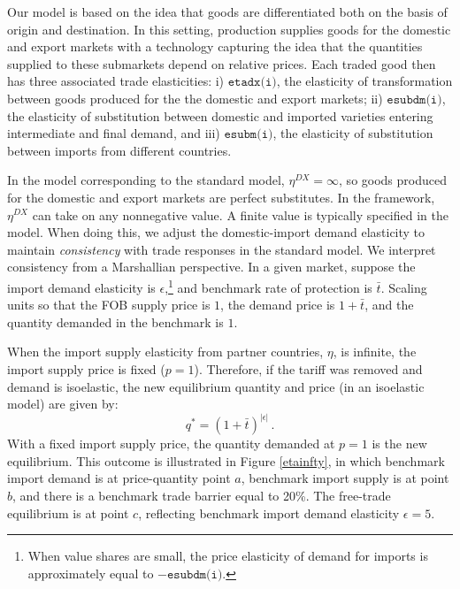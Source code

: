 Our \SOE model is based on the idea that goods are differentiated both
on the basis of origin and destination. In this setting, production
supplies goods for the domestic and export markets with a technology
capturing the idea that the quantities supplied to these submarkets
depend on relative prices. Each traded good then has three
associated trade elasticities: i) $\texttt{etadx(i)}$, the elasticity
of transformation between goods produced for the the domestic and
export markets; ii) $\texttt{esubdm(i)}$, the elasticity of
substitution between domestic and imported varieties entering
intermediate and final demand, and iii) $\texttt{esubm(i)}$, the
elasticity of substitution between imports from different countries.

In the \GMR model corresponding to the standard \GTAP model,
$\eta^{DX} = \infty$, so goods produced for the domestic and export
markets are perfect substitutes. In the \GTAPINGAMS framework,
$\eta^{DX}$ can take on any nonnegative value.  A finite value is
typically specified in the \SOE model. When doing this, we adjust the
domestic-import demand elasticity to maintain \textit{consistency}
with trade responses in the standard \GTAP model. We interpret
consistency from a Marshallian perspective. In a given market, suppose
the import demand elasticity is $\epsilon$,\footnote{When value shares
are small, the price elasticity of demand for imports is approximately
equal to $-\texttt{esubdm(i)}$.} and benchmark rate of protection is
$\bar t$. Scaling units so that the FOB supply price is $1$, the
demand price is $1+\bar t$, and the quantity demanded in the benchmark
is $1$.

When the import supply elasticity from partner countries, $\eta$,
is infinite, the import supply price is fixed  ($p=1$).
Therefore, if the tariff was removed and demand is isoelastic, the
new equilibrium quantity and price (in an isoelastic model) are given by:
\begin{equation}
\label{newqty}
q^* = \left(1 + \bar t \right)^{|\epsilon|}\,.
\end{equation}
With a fixed import supply price, the quantity demanded at $p=1$ is
the new equilibrium. This outcome is illustrated in Figure
\ref{etainfty}, in which benchmark import demand is at price-quantity
point $a$, benchmark import supply is at point $b$, and there is a
benchmark trade barrier equal to 20\%. The free-trade equilibrium is
at point $c$, reflecting benchmark import demand elasticity $\epsilon = 5$.

